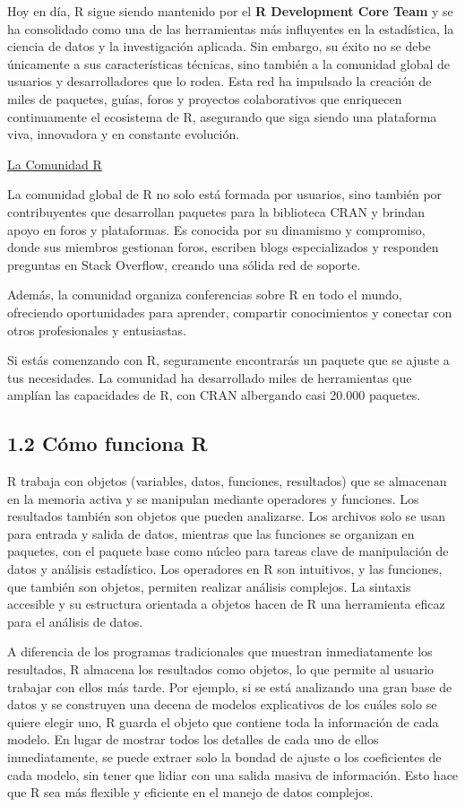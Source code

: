 \documentclass[
  letterpaper,
]{scrbook}
\begin{document}
Hoy en día, R sigue siendo mantenido por el \textbf{R Development Core
Team} y se ha consolidado como una de las herramientas más influyentes
en la estadística, la ciencia de datos y la investigación aplicada. Sin
embargo, su éxito no se debe únicamente a sus características técnicas,
sino también a la comunidad global de usuarios y desarrolladores que lo
rodea. Esta red ha impulsado la creación de miles de paquetes, guías,
foros y proyectos colaborativos que enriquecen continuamente el
ecosistema de R, asegurando que siga siendo una plataforma viva,
innovadora y en constante evolución.

\uline{La Comunidad R}

La comunidad global de R no solo está formada por usuarios, sino también
por contribuyentes que desarrollan paquetes para la biblioteca CRAN y
brindan apoyo en foros y plataformas. Es conocida por su dinamismo y
compromiso, donde sus miembros gestionan foros, escriben blogs
especializados y responden preguntas en Stack Overflow, creando una
sólida red de soporte.

Además, la comunidad organiza conferencias sobre R en todo el mundo,
ofreciendo oportunidades para aprender, compartir conocimientos y
conectar con otros profesionales y entusiastas.

Si estás comenzando con R, seguramente encontrarás un paquete que se
ajuste a tus necesidades. La comunidad ha desarrollado miles de
herramientas que amplían las capacidades de R, con CRAN albergando casi
20.000 paquetes.

\hypertarget{cuxf3mo-funciona-r}{%
\subsection{1.2 Cómo funciona R}\label{cuxf3mo-funciona-r}}

R trabaja con objetos (variables, datos, funciones, resultados) que se
almacenan en la memoria activa y se manipulan mediante operadores y
funciones. Los resultados también son objetos que pueden analizarse. Los
archivos solo se usan para entrada y salida de datos, mientras que las
funciones se organizan en paquetes, con el paquete base como núcleo para
tareas clave de manipulación de datos y análisis estadístico. Los
operadores en R son intuitivos, y las funciones, que también son
objetos, permiten realizar análisis complejos. La sintaxis accesible y
su estructura orientada a objetos hacen de R una herramienta eficaz para
el análisis de datos.

A diferencia de los programas tradicionales que muestran inmediatamente
los resultados, R almacena los resultados como objetos, lo que permite
al usuario trabajar con ellos más tarde. Por ejemplo, si se está
analizando una gran base de datos y se construyen una decena de modelos
explicativos de los cuáles solo se quiere elegir uno, R guarda el objeto
que contiene toda la información de cada modelo. En lugar de mostrar
todos los detalles de cada uno de ellos inmediatamente, se puede extraer
solo la bondad de ajuste o los coeficientes de cada modelo, sin tener
que lidiar con una salida masiva de información. Esto hace que R sea más
flexible y eficiente en el manejo de datos complejos.
\end{document}
